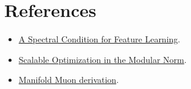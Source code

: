 \documentclass[12pt]{article}
\begin{document}
\section{References}

\begin{itemize}
    \item \href{https://arxiv.org/abs/2310.17813}{A Spectral Condition for Feature Learning}.
    \item \href{https://arxiv.org/abs/2405.14813}{Scalable Optimization in the Modular Norm}.
    \item \href{https://thinkingmachines.ai/blog/modular-manifolds/}{Manifold Muon derivation}.
\end{itemize}
\end{document}

